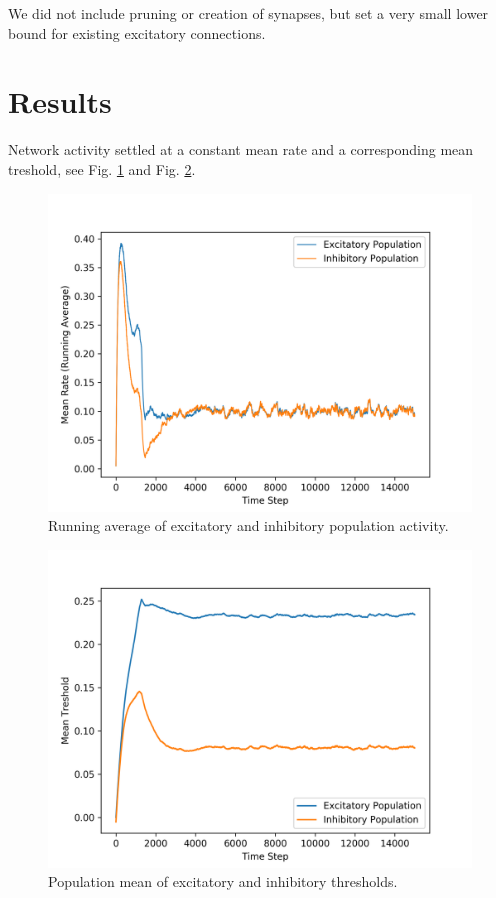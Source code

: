 \documentclass[10pt,a4paper]{article}
\begin{document}
We did not include pruning or creation of synapses, but set a very small lower bound for existing excitatory connections.

\section{Results}

Network activity settled at a constant mean rate and a corresponding mean treshold, see Fig. \ref{fig:pop_act_time} and Fig. \ref{fig:thresholds_time}. 

\begin{figure}
\includegraphics[width=\textwidth]{../plots/pop_act_time.png}
\caption{\label{fig:pop_act_time} Running average of excitatory and inhibitory population activity.}
\end{figure}

\begin{figure}
\includegraphics[width=\textwidth]{../plots/thresholds_time.png}
\caption{\label{fig:thresholds_time} Population mean of excitatory and inhibitory thresholds.}
\end{figure}
\end{document}
